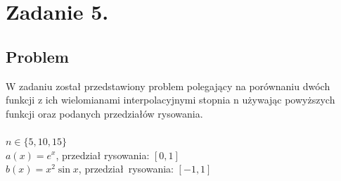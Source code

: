 \documentclass[11pt, a4paper]{article}
\begin{document}
    \section{Zadanie 5.}
    \subsection{Problem}
    W zadaniu został przedstawiony problem polegający na porównaniu dwóch funkcji z ich wielomianami interpolacyjnymi stopnia n używając powyższych funkcji oraz podanych przedziałów rysowania.\\
    \\
    $n \in \{5, 10, 15\}$\\
    $a(x) = e^{x}$, przedział rysowania: $[0,1]$\\
    $b(x) = x^2\sin{x}$, przedział rysowania: $[-1, 1]$
\end{document}
